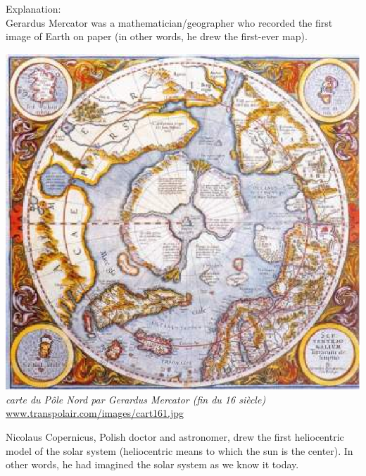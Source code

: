 \documentclass[letterpaper, 12pt]{article}
\begin{document}
Explanation:\\
Gerardus Mercator was a mathematician/geographer who recorded the first image of Earth on paper (in other words, he drew the first-ever map).
\begin{center}
\includegraphics[scale=0.3]{carte.eps}\\
\emph{{\small carte du P\^ole Nord par Gerardus Mercator (fin du 16\ieme{} si\`ecle)}}\\
\href{http://www.transpolair.com/images/cart161.jpg}{www.transpolair.com/images/cart161.jpg}
\end{center}
Nicolaus Copernicus, Polish doctor and astronomer, drew the first heliocentric model of the solar system (heliocentric means to which the sun is the center). In other words, he had imagined the solar system as we know it today.
\end{document}
